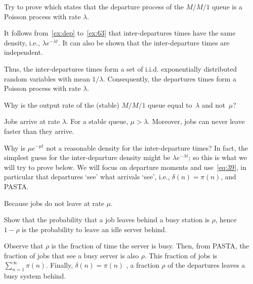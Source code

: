 \begin{exercise}
 Try to prove  which states that the departure process of the $M/M/1$ queue is a Poisson process with rate $\lambda$.
\begin{solution}
 It follows from~\cref{ex:dep} to~\cref{ex:63} that inter-departures times have the same density, i.e., $\lambda e^{-\lambda t}$.
 It can also be shown that the inter-departure times are independent.

Thus, the inter-departures times form a set of i.i.d.
exponentially distributed random variables with mean $1/\lambda$.
Consequently, the departures times form a Poisson process with rate $\lambda$.

\end{solution}
\end{exercise}



\begin{extra}
Why is the output rate of the (stable) $M/M/1$ queue equal to~$\lambda$ and not~$\mu$?
\begin{solution}
Jobs arrive at rate $\lambda$. For a stable queue, $\mu>\lambda$. Moreover, jobs can never leave faster than they arrive.
\end{solution}
\end{extra}


\begin{extra}
 Why is $\mu e^{-\mu t}$ not a reasonable density for the inter-departure times?
 In fact, the simplest guess for the inter-departure density might be $\lambda e^{-\lambda t}$; so this is what we will try to prove below.
We will focus on departure moments and use~\cref{eq:39}, in particular that departures `see' what arrivals `see', i.e., $\delta(n)= \pi(n)$, and PASTA.
\begin{solution}
 Because jobs do not leave at rate $\mu$. 
\end{solution}
\end{extra}




\begin{extra}
Show that the probability that a job leaves behind a busy station is $\rho$, hence $1-\rho$ is the probability to leave an idle server behind.
\begin{solution}
Observe that $\rho$ is the fraction of time the server is busy. Then, from PASTA, the fraction of jobs that see a busy server is also $\rho$. This fraction of jobs is $\sum_{n=1}^\infty \pi(n)$. Finally, $\delta(n) = \pi(n)$ , a fraction $\rho$ of the departures leaves a busy system behind.

\end{solution}
\end{extra}


